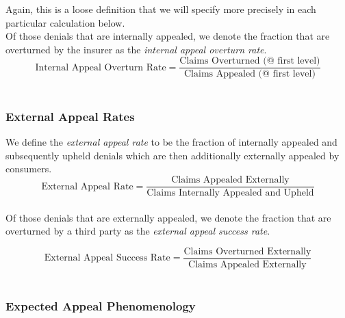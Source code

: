 \documentclass[12pt, a4paper,twoside]{report}
\theoremstyle{plain} %
\theoremstyle{definition} %
\theoremstyle{remark} %
\numberwithin{equation}{chapter}
\begin{document}
		Again, this is a loose definition that we will specify more precisely in each particular calculation below.\\
		
		Of those denials that are internally appealed, we denote the fraction that are overturned by the insurer as the \emph{internal appeal overturn rate}.\\
		
		\begin{equation*}
			\text{Internal Appeal Overturn Rate} = \dfrac{\text{Claims Overturned (@ first level)}}{\text{Claims Appealed (@ first level)}}
		\end{equation*}
		\hfill\\
		
		
		\subsubsection{External Appeal Rates}
		
		We define the \emph{external appeal rate} to be the fraction of internally appealed and subsequently upheld denials which are then additionally externally appealed by consumers.\\
		
		\begin{equation*}
			\text{External Appeal Rate} = \dfrac{\text{Claims Appealed Externally}}{\text{Claims Internally Appealed and Upheld}}
		\end{equation*}
		\hfill\\
		
		
		Of those denials that are externally appealed, we denote the fraction that are overturned by a third party as the \emph{external appeal success rate}.
		
		\begin{equation*}
			\text{External Appeal Success Rate} = \dfrac{\text{Claims Overturned Externally}}{\text{Claims Appealed Externally}}
		\end{equation*}
		\hfill\\
		
		
		\subsubsection{Expected Appeal Phenomenology}
		
\end{document}
